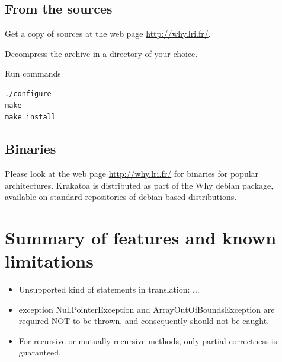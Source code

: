 \documentclass[a4paper,11pt,twoside,openright]{report}
\begin{document}
\subsection{From the sources}

Get a copy of sources at the web page \url{http://why.lri.fr/}. 

Decompress the archive in a directory of your choice.

Run commands
\begin{verbatim}
./configure
make
make install
\end{verbatim}

\subsection{Binaries}

Please look at the web page \url{http://why.lri.fr/} for binaries for
popular architectures. Krakatoa is distributed as part of the Why
debian package, available on standard repositories of debian-based
distributions.
 
\section{Summary of features and known limitations}
\label{sec:features}

\begin{itemize}

\item Unsupported kind of statements in translation: ...

\item exception NullPointerException and ArrayOutOfBoundsException are
required NOT to be thrown, and consequently should not be caught.


\item For recursive or mutually recursive methods, only partial
correctness is guaranteed.

\end{itemize}
\end{document}
